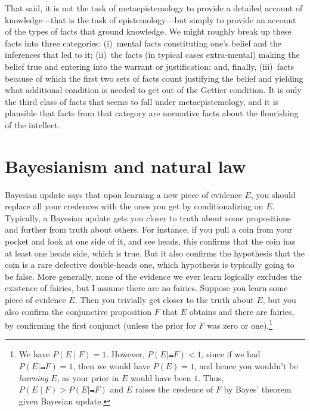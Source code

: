 That said, it is not the task of metaepistemology to provide a detailed account of knowledge---that is the task of epistemology---but simply
to provide an account of the types of facts that ground knowledge. We might roughly break up these facts into three categories:
(i)~mental facts constituting one's belief and the inferences that led to it; (ii)~the facts (in typical cases extra-mental) making the 
belief true and entering into the warrant or justification; and, finally, (iii)~facts because of which the first two sets of
facts count justifying the belief and yielding what additional condition is needed to get out of the Gettier condition. It is only
the third class of facts that seems to fall under metaepistemology, and it is plausible that facts from that category are normative 
facts about the flourishing of the intellect. 

\section{Bayesianism and natural law}
Bayesian update says that upon learning a new piece of evidence $E$, you should replace all your credences with the 
ones you get by conditionalizing on $E$. Typically, a Bayesian update gets you closer to truth about some 
propositions and further from truth about others. For instance, if you pull a coin from your pocket and look at one
side of it, and see heads, this confirms that the coin has at least one heads side, which is true. But it also 
confirms the hypothesis that the coin is a rare defective double-heads one, which hypothesis is typically going to 
be false. More generally, none of the evidence we ever learn logically excludes the existence of fairies, but I 
assume there are no fairies. Suppose you learn some piece of evidence $E$. Then you trivially get closer to the truth
about $E$, but you also confirm the conjunctive proposition $F$ that $E$ obtains and there are fairies, by confirming the 
first conjunct (unless the prior for $F$ was zero or one).\footnote{We have $P(E\mid F)=1$. However, $P(E\mid \Not F)<1$,
since if we had $P(E\mid \Not F)=1$, then we would have $P(E)=1$, and hence you wouldn't be \textit{learning} $E$, as your
prior in $E$ would have been $1$. Thus, $P(E\mid F)>P(E\mid\Not F)$ and $E$ raises the credence of $F$ by Bayes' theorem
given Bayesian update.} 


